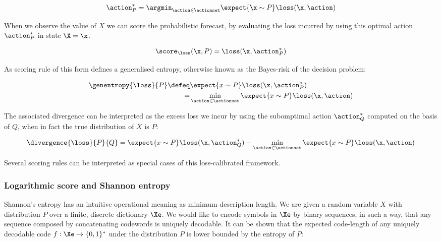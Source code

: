 \begin{align}
	\action^{*}_{P} = \argmin_{\action\in\actionset} \expect{\x \sim P} \loss(\x,\action)
\end{align}

When we observe the value of $X$ we can score the probabilistic forecast, by evaluating the loss incurred by using this optimal action $\action^{*}_{P}$ in state $\X=\x$.

\begin{align}
	\score_{\loss}(\x,P) = \loss(\x,\action^{*}_{P})
\end{align}

As scoring rule of this form defines a generalised entropy, otherwise known as the Bayes-risk of the decision problem:

\begin{align}
	\genentropy{\loss}{P} \defeq &\expect{x\sim P} \loss(\x,\action^{*}_{P})\\
		= &\min_{\action\in\actionset} \expect{x\sim P} \loss(\x,\action)
\end{align}

The associated divergence can be interpreted as the excess loss we incur by using the subomptimal action $\action^{*}_{Q}$ computed on the basis of $Q$, when in fact the true distribution of $X$ is $P$:

\begin{align}
	\divergence{\loss}{P}{Q} = \expect{x\sim P} \loss(\x,\action^{*}_{Q}) - \min_{\action \in \actionset}\expect{x\sim P} \loss(\x,\action)
\end{align}

Several scoring rules can be interpreted as special cases of this loss-calibrated framework.

\subsubsection{Logarithmic score and Shannon entropy}

Shannon's entropy has an intuitive operational meaning as minimum description length. We are given a random variable $X$ with distribution $P$ over a finite, discrete dictionary $\Xe$. We would like to encode symbols in $\Xe$ by binary sequences, in such a way, that any sequence composed by concatenating codewords is uniquely decodable. It can be shown that the expected code-length of any uniquely decodable code $f:\Xe\mapsto\{0,1\}^{*}$ under the distribution $P$ is lower bounded by the entropy of $P$:

